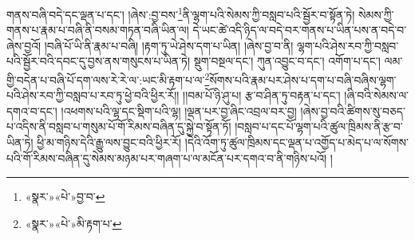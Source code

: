 གནས་བཞི་བདེ་དང་ལྡན་པ་དང་། །ཞེས་:བྱ་བས་\footnote{«སྣར་»«པེ་»བྱ་བ་}ནི་ལྷག་པའི་སེམས་ཀྱི་བསླབ་པའི་སྦྱོར་བ་སྟོན་ཏེ། སེམས་ཀྱི་གནས་པ་རྣམ་པ་བཞི་ནི་བསམ་གཏན་བཞི་ཡིན་ལ། དེ་ཡང་ཚེ་འདི་ཉིད་ལ་བདེ་བར་གནས་པ་ཡིན་པས་ན་བདེ་བ་ཞེས་བྱའོ། །བཞི་པོ་ཡི་ནི་རྣམ་པ་བཞི། །རྟག་ཏུ་ཡེ་ཤེས་དག་པ་ཡིན། །ཞེས་བྱ་བ་ནི། ལྷག་པའི་ཤེས་རབ་ཀྱི་བསླབ་པའི་སྦྱོར་བའི་དབང་དུ་བྱས་ནས་གསུངས་པ་ཡིན་ཏེ། སྡུག་བསྔལ་དང་། ཀུན་འབྱུང་བ་དང་། འགོག་པ་དང་། ལམ་གྱི་བདེན་པ་བཞི་པོ་དག་ལས་རེ་རེ་ལ་:ཡང་མི་རྟག་པ་ལ་\footnote{«སྣར་»«པེ་»མི་རྟག་པ་}སོགས་པའི་རྣམ་པར་ཤེས་པ་དག་པ་བཞི་བཞིས་ལྷག་པའི་ཤེས་རབ་ཀྱི་བསླབ་པ་རབ་ཏུ་ཕྱེ་བའི་ཕྱིར་རོ།། །།བམ་པོ་ཉི་ཤུ་པ། རྩ་བ་ཤིན་ཏུ་བརྟན་པ་དང་། །ཞི་བའི་སེམས་ལ་དགའ་བ་དང་། །འཕགས་པའི་ལྷ་དང་སྡིག་པའི་ལྷ། །ལྡན་པར་བྱ་ཞིང་འབྲལ་བར་བྱ། །ཞེས་བྱ་བའི་ཚིགས་སུ་བཅད་པ་འདིས་ནི་བསླབ་པ་གསུམ་པོ་གོ་རིམས་བཞིན་དུ་སྐྱེ་བ་སྟོན་ཏོ། །བསླབ་པ་དང་པོ་ལྷག་པའི་ཚུལ་ཁྲིམས་ནི་རྩ་བ་ཡིན་ཏེ། ཕྱི་མ་གཉིས་དེའི་རྒྱུ་ལས་བྱུང་བའི་ཕྱིར་རོ། །དེའི་འོག་ཏུ་ཚུལ་ཁྲིམས་དང་ལྡན་པ་འགྱོད་པ་མེད་པ་ལ་སོགས་པའི་གོ་རིམས་བཞིན་དུ་སེམས་མཉམ་པར་གཞག་པ་ལ་མངོན་པར་དགའ་བ་ནི་གཉིས་པའོ། །
